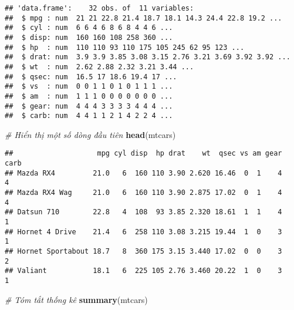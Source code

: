 \documentclass[
]{article}
\newenvironment{Shaded}{\begin{snugshade}}{\end{snugshade}}
\newcommand{\CommentTok}[1]{\textcolor[rgb]{0.56,0.35,0.01}{\textit{#1}}}
\newcommand{\FunctionTok}[1]{\textcolor[rgb]{0.13,0.29,0.53}{\textbf{#1}}}
\newcommand{\NormalTok}[1]{#1}
\begin{document}
\begin{verbatim}
## 'data.frame':    32 obs. of  11 variables:
##  $ mpg : num  21 21 22.8 21.4 18.7 18.1 14.3 24.4 22.8 19.2 ...
##  $ cyl : num  6 6 4 6 8 6 8 4 4 6 ...
##  $ disp: num  160 160 108 258 360 ...
##  $ hp  : num  110 110 93 110 175 105 245 62 95 123 ...
##  $ drat: num  3.9 3.9 3.85 3.08 3.15 2.76 3.21 3.69 3.92 3.92 ...
##  $ wt  : num  2.62 2.88 2.32 3.21 3.44 ...
##  $ qsec: num  16.5 17 18.6 19.4 17 ...
##  $ vs  : num  0 0 1 1 0 1 0 1 1 1 ...
##  $ am  : num  1 1 1 0 0 0 0 0 0 0 ...
##  $ gear: num  4 4 4 3 3 3 3 4 4 4 ...
##  $ carb: num  4 4 1 1 2 1 4 2 2 4 ...
\end{verbatim}

\begin{Shaded}
\begin{Highlighting}[]
\CommentTok{\# Hiển thị một số dòng đầu tiên}
\FunctionTok{head}\NormalTok{(mtcars)}
\end{Highlighting}
\end{Shaded}

\begin{verbatim}
##                    mpg cyl disp  hp drat    wt  qsec vs am gear carb
## Mazda RX4         21.0   6  160 110 3.90 2.620 16.46  0  1    4    4
## Mazda RX4 Wag     21.0   6  160 110 3.90 2.875 17.02  0  1    4    4
## Datsun 710        22.8   4  108  93 3.85 2.320 18.61  1  1    4    1
## Hornet 4 Drive    21.4   6  258 110 3.08 3.215 19.44  1  0    3    1
## Hornet Sportabout 18.7   8  360 175 3.15 3.440 17.02  0  0    3    2
## Valiant           18.1   6  225 105 2.76 3.460 20.22  1  0    3    1
\end{verbatim}

\begin{Shaded}
\begin{Highlighting}[]
\CommentTok{\# Tóm tắt thống kê}
\FunctionTok{summary}\NormalTok{(mtcars)}
\end{Highlighting}
\end{Shaded}
\end{document}
